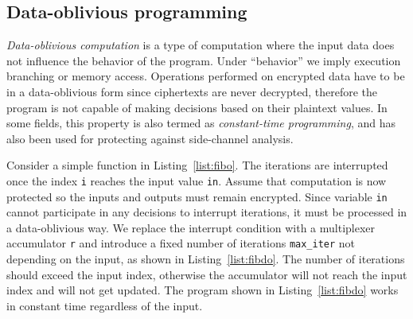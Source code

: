 

\subsection{Data-oblivious programming}

{\it Data-oblivious computation} is a type of computation where the input data does not influence the behavior of the program. Under ``behavior'' we imply execution branching or memory access. 
Operations performed on encrypted data have to be in a data-oblivious form since ciphertexts are never decrypted, therefore the program is not capable of making decisions based on their plaintext values. In some fields, this property is also termed as {\it constant-time programming}, and has also been used for protecting against side-channel analysis.


Consider a simple function in Listing~\ref{list:fibo}. The iterations are interrupted once the index {\tt i} reaches the input value \texttt{in}. Assume that computation is now protected so the inputs and outputs must remain encrypted. Since variable {\tt in} cannot participate in any decisions to interrupt iterations, it must be processed in a data-oblivious way. We replace the interrupt condition with a multiplexer accumulator {\tt r} and introduce a fixed number of iterations {\tt max\_iter} not depending on the input, as shown in Listing~\ref{list:fibdo}. The number of iterations should exceed the input index, otherwise the accumulator will not reach the input index and will not get updated. The program shown in Listing~\ref{list:fibdo} works in constant time regardless of the input.

